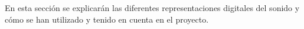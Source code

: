 En esta sección se explicarán las diferentes representaciones digitales del sonido y cómo se han utilizado y tenido en cuenta en el proyecto.